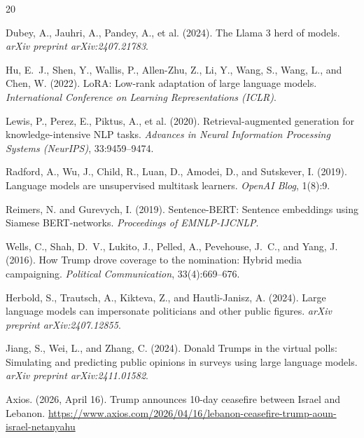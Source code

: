 \documentclass[11pt,a4paper]{article}
\begin{document}
\begin{thebibliography}{20}

Dubey, A., Jauhri, A., Pandey, A., et al. (2024).
\newblock The Llama 3 herd of models.
\newblock \textit{arXiv preprint arXiv:2407.21783}.

Hu, E.~J., Shen, Y., Wallis, P., Allen-Zhu, Z., Li, Y., Wang, S., Wang, L., and Chen, W. (2022).
\newblock LoRA: Low-rank adaptation of large language models.
\newblock \textit{International Conference on Learning Representations (ICLR)}.

Lewis, P., Perez, E., Piktus, A., et al. (2020).
\newblock Retrieval-augmented generation for knowledge-intensive NLP tasks.
\newblock \textit{Advances in Neural Information Processing Systems (NeurIPS)}, 33:9459--9474.

Radford, A., Wu, J., Child, R., Luan, D., Amodei, D., and Sutskever, I. (2019).
\newblock Language models are unsupervised multitask learners.
\newblock \textit{OpenAI Blog}, 1(8):9.

Reimers, N. and Gurevych, I. (2019).
\newblock Sentence-BERT: Sentence embeddings using Siamese BERT-networks.
\newblock \textit{Proceedings of EMNLP-IJCNLP}.

Wells, C., Shah, D.~V., Lukito, J., Pelled, A., Pevehouse, J.~C., and Yang, J. (2016).
\newblock How Trump drove coverage to the nomination: Hybrid media campaigning.
\newblock \textit{Political Communication}, 33(4):669--676.

Herbold, S., Trautsch, A., Kikteva, Z., and Hautli-Janisz, A. (2024).
\newblock Large language models can impersonate politicians and other public figures.
\newblock \textit{arXiv preprint arXiv:2407.12855}.

Jiang, S., Wei, L., and Zhang, C. (2024).
\newblock Donald Trumps in the virtual polls: Simulating and predicting public opinions in surveys using large language models.
\newblock \textit{arXiv preprint arXiv:2411.01582}.

Axios. (2026, April 16).
\newblock Trump announces 10-day ceasefire between Israel and Lebanon.
\newblock \url{https://www.axios.com/2026/04/16/lebanon-ceasefire-trump-aoun-israel-netanyahu}


\end{thebibliography}
\end{document}
